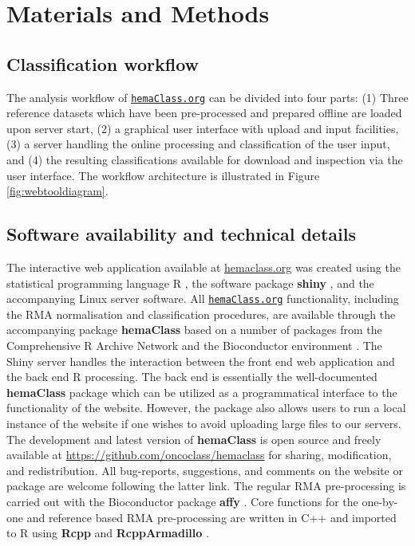 \documentclass[twocolumn]{bmcart}%
\newcommand{\hemaClass}{\href{http://hemaClass.org}{\texttt{hemaClass.org}}}
\newcommand{\R}{\textsf{R}}
\newcommand{\pkg}[1]{\textbf{#1}}
\begin{document}
\section{Materials and Methods}



\subsection{Classification workflow}
The analysis workflow of \hemaClass{} can be divided into four parts:
(1) Three reference datasets which have been pre-processed and prepared offline are loaded upon server start,
(2) a graphical user interface with upload and input facilities,
(3) a server handling the online processing and classification of the user input, and
(4) the resulting classifications available for download and inspection via the user interface.
The workflow architecture is illustrated in Figure \ref{fig:webtooldiagram}.



\subsection{Software availability and technical details}
The interactive web application available at \url{hemaclass.org} was created using the statistical programming language \R{} \cite{RCoreTeam}, the software package \pkg{shiny} \cite{shiny}, and the accompanying Linux server software.
All \hemaClass{} functionality, including the RMA normalisation and classification procedures, are available through the accompanying package \pkg{hemaClass} based on a number of packages from the Comprehensive R Archive Network \cite{RCoreTeam} and the Bioconductor environment \cite{Gentleman2004}.
The Shiny server handles the interaction between the front end web application and the back end \R{} processing.
The back end is essentially the well-documented \pkg{hemaClass} package which can be utilized as a programmatical interface to the functionality of the website.
However, the package also allows users to run a local instance of the website if one wishes to avoid uploading large files to our servers.
The development and latest version of \pkg{hemaClass} is open source and freely available at \url{https://github.com/oncoclass/hemaclass} for sharing, modification, and redistribution.
All bug-reports, suggestions, and comments on the website or package are welcome following the latter link.
The regular RMA pre-processing is carried out with the Bioconductor package \pkg{affy} \cite{Gautier2004}.
Core functions for the one-by-one and reference based RMA pre-processing are written in \textsf{C++} and imported to \R{} using \pkg{Rcpp} and \pkg{RcppArmadillo} \cite{Rcpp2013,Eddelbuettel2011,RcppArmadillo,Sanderson2010}.
\end{document}
